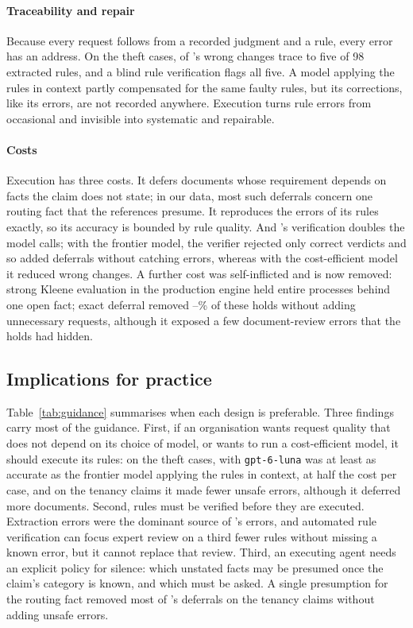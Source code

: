 \paragraph{Traceability and repair}
Because every request follows from a recorded judgment and a rule, every error has an address. On the theft cases, \ecWrongFaulty{} of \casepath's \thTerraCPWrong{} wrong changes trace to five of 98 extracted rules, and a blind rule verification flags all five. A model applying the rules in context partly compensated for the same faulty rules, but its corrections, like its errors, are not recorded anywhere. Execution turns rule errors from occasional and invisible into systematic and repairable.

\paragraph{Costs}
Execution has three costs. It defers documents whose requirement depends on facts the claim does not state; in our data, most such deferrals concern one routing fact that the references presume. It reproduces the errors of its rules exactly, so its accuracy is bounded by rule quality. And \casepath's verification doubles the model calls; with the frontier model, the verifier rejected only correct verdicts and so added deferrals without catching errors, whereas with the cost-efficient model it reduced wrong changes. A further cost was self-inflicted and is now removed: strong Kleene evaluation in the production engine held entire processes behind one open fact; exact deferral removed \tenTerraExactCut--\tenLunaExactCut\% of these holds without adding unnecessary requests, although it exposed a few document-review errors that the holds had hidden.

\subsection{Implications for practice}
\label{sec:practice}

Table~\ref{tab:guidance} summarises when each design is preferable. Three findings carry most of the guidance. First, if an organisation wants request quality that does not depend on its choice of model, or wants to run a cost-efficient model, it should execute its rules: on the theft cases, \casepath with \texttt{gpt-6-luna} was at least as accurate as the frontier model applying the rules in context, at half the cost per case, and on the tenancy claims it made fewer unsafe errors, although it deferred more documents. Second, rules must be verified before they are executed. Extraction errors were the dominant source of \casepath's errors, and automated rule verification can focus expert review on a third fewer rules without missing a known error, but it cannot replace that review. Third, an executing agent needs an explicit policy for silence: which unstated facts may be presumed once the claim's category is known, and which must be asked. A single presumption for the routing fact removed most of \casepath's deferrals on the tenancy claims without adding unsafe errors.

